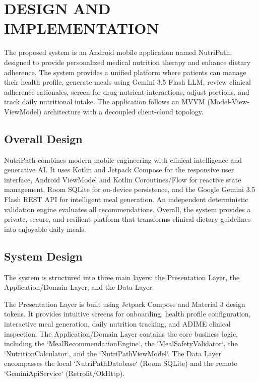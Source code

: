 \documentclass[a4paper,12pt]{report}
\begin{document}
\chapter{DESIGN AND IMPLEMENTATION}

The proposed system is an Android mobile application named NutriPath, designed to provide personalized medical nutrition therapy and enhance dietary adherence. The system provides a unified platform where patients can manage their health profile, generate meals using Gemini 3.5 Flash LLM, review clinical adherence rationales, screen for drug-nutrient interactions, adjust portions, and track daily nutritional intake. The application follows an MVVM (Model-View-ViewModel) architecture with a decoupled client-cloud topology.

\section{Overall Design}
NutriPath combines modern mobile engineering with clinical intelligence and generative AI. It uses Kotlin and Jetpack Compose for the responsive user interface, Android ViewModel and Kotlin Coroutines/Flow for reactive state management, Room SQLite for on-device persistence, and the Google Gemini 3.5 Flash REST API for intelligent meal generation. An independent deterministic validation engine evaluates all recommendations. Overall, the system provides a private, secure, and resilient platform that transforms clinical dietary guidelines into enjoyable daily meals.

\section{System Design}
The system is structured into three main layers: the Presentation Layer, the Application/Domain Layer, and the Data Layer.

The Presentation Layer is built using Jetpack Compose and Material 3 design tokens. It provides intuitive screens for onboarding, health profile configuration, interactive meal generation, daily nutrition tracking, and ADIME clinical inspection. The Application/Domain Layer contains the core business logic, including the `MealRecommendationEngine`, the `MealSafetyValidator`, the `NutritionCalculator`, and the `NutriPathViewModel`. The Data Layer encompasses the local `NutriPathDatabase` (Room SQLite) and the remote `GeminiApiService` (Retrofit/OkHttp).
\end{document}
